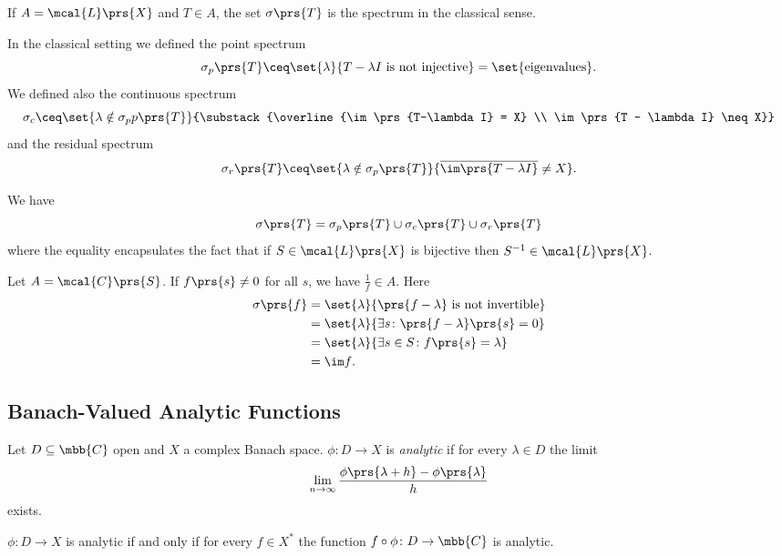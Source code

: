 \documentclass[10pt, twoside]{book}
\begin{document}
\begin{example}
If $A = \mcal{L}\prs{X}$ and $T \in A$, the set $\sigma\prs{T}$ is the spectrum in the classical sense.

In the classical setting we defined the point spectrum
\[\sigma_p\prs{T} \ceq \set{\lambda}{T-\lambda I \text{ is not injective}} = \set{\text{eigenvalues}} \text{.}\]
We defined also the continuous spectrum
\[\sigma_c \ceq \set{\lambda \notin \sigma_pp\prs{T}}{\substack{\overline{\im \prs{T-\lambda I} = X} \\ \im\prs{T - \lambda I} \neq X}}\]
and the residual spectrum
\[\sigma_r\prs{T} \ceq \set{\lambda \notin \sigma_p\prs{T}}{\overline{\im\prs{T-\lambda I}} \neq X} \text{.}\]

We have
\[\sigma\prs{T} = \sigma_p\prs{T} \cup \sigma_c \prs{T} \cup \sigma_r\prs{T}\]
where the equality encapsulates the fact that if $S \in \mcal{L}\prs{X}$ is bijective then $S^{-1} \in \mcal{L}\prs{X}$.
\end{example}

\begin{example}
Let $A = \mcal{C}\prs{S}$. If $f\prs{s} \neq 0$ for all $s$, we have $\frac{1}{f} \in A$. Here
\begin{align*}
\sigma\prs{f} &= \set{\lambda}{\prs{f-\lambda} \text{ is not invertible}}
\\&= \set{\lambda}{\exists s \colon \prs{f-\lambda}\prs{s} = 0}
\\&= \set{\lambda}{\exists s \in S \colon f\prs{s} = \lambda}
\\&= \im f \text{.}
\end{align*}
\end{example}

\subsection{Banach-Valued Analytic Functions}

\begin{definition}
Let $D \subseteq \mbb{C}$ open and $X$ a complex Banach space. $\phi \colon D \to X$ is \emph{analytic} if for every $\lambda \in D$ the limit
\[\lim_{n\to\infty} \frac{\phi\prs{\lambda + h} - \phi\prs{\lambda}}{h}\]
exists.
\end{definition}

\begin{theorem}
$\phi \colon D \to X$ is analytic if and only if for every $f \in X^*$ the function $f \circ \phi \colon D \to \mbb{C}$ is analytic.
\end{theorem}
\end{document}
